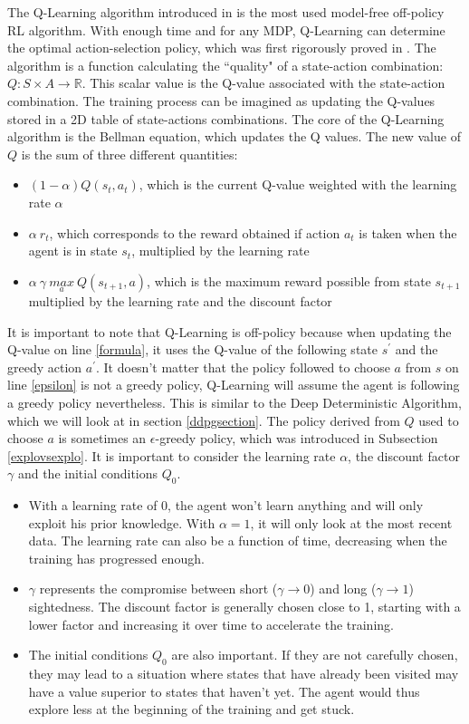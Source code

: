 The Q-Learning algorithm introduced in \cite{watkins1989} is the most used model-free off-policy RL algorithm. With enough time and for any MDP, Q-Learning can determine the optimal action-selection policy, which was first rigorously proved in \cite{qlearningconvergence}. The algorithm is a function calculating the ``quality" of a state-action combination: $Q: S \times A \rightarrow \mathbb{R}$. This scalar value is the Q-value associated with the state-action combination. The training process can be imagined as updating the Q-values stored in a 2D table of state-actions combinations. The core of the Q-Learning algorithm is the Bellman equation, which updates the Q values. The new value of $Q$ is the sum of three different quantities: 

\begin{itemize}
	\item $(1-\alpha)Q(s_t,a_t)$, which is the current Q-value weighted with the learning rate $\alpha$
	\item $\alpha \: r_t$, which corresponds to the reward obtained if action $a_t$ is taken when the agent is in state $s_t$, multiplied by the learning rate
	\item $\alpha \: \gamma \: \underset{a}{max} \: Q(s_{t+1},a)$, which is the maximum reward possible from state $s_{t+1}$ multiplied by the learning rate and the discount factor
\end{itemize}

It is important to note that Q-Learning is off-policy because when updating the Q-value on line \ref{formula}, it uses the Q-value of the following state $s^{'}$ and the greedy action $a^{'}$. It doesn't matter that the policy followed to choose $a$ from $s$ on line \ref{epsilon} is not a greedy policy, Q-Learning will assume the agent is following a greedy policy nevertheless. This is similar to the Deep Deterministic Algorithm, which we will look at in section \ref{ddpgsection}.
The policy derived from $Q$ used to choose $a$ is sometimes an $\epsilon$-greedy policy, which was introduced in Subsection \ref{explovsexplo}. 
\newline
It is important to consider the learning rate $\alpha$, the discount factor $\gamma$ and the initial conditions $Q_0$.
\begin{itemize}
	\item With a learning rate of 0, the agent won't learn anything and will only exploit his prior knowledge. With $\alpha = 1$, it will only look at the most recent data. The learning rate can also be a function of time, decreasing when the training has progressed enough.
	\item $\gamma$ represents the compromise between short ($\gamma \rightarrow 0$) and long ($\gamma \rightarrow 1$) sightedness. The discount factor is generally chosen close to 1, starting with a lower factor and increasing it over time to accelerate the training.
	\item The initial conditions $Q_0$ are also important. If they are not carefully chosen, they may lead to a situation where states that have already been visited may have a value superior to states that haven't yet. The agent would thus explore less at the beginning of the training and get stuck.
\end{itemize}

